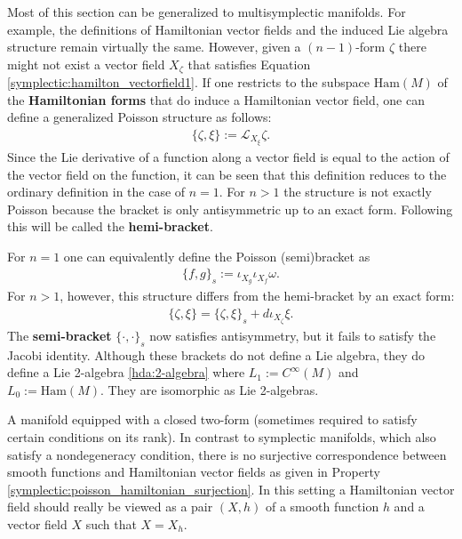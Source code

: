     \begin{remark}\label{symplectic:hamiltonian_forms}
        Most of this section can be generalized to multisymplectic manifolds. For example, the definitions of Hamiltonian vector fields and the induced Lie algebra structure remain virtually the same. However, given a $(n-1)$-form $\zeta$ there might not exist a vector field $X_\zeta$ that satisfies Equation \eqref{symplectic:hamilton_vectorfield1}. If one restricts to the subspace $\mathrm{Ham}(M)$ of the \textbf{Hamiltonian forms} that do induce a Hamiltonian vector field, one can define a generalized Poisson structure as follows:
        \begin{gather}
            \{\zeta,\xi\} := \mathcal{L}_{X_\xi}\zeta.
        \end{gather}
        Since the Lie derivative of a function along a vector field is equal to the action of the vector field on the function, it can be seen that this definition reduces to the ordinary definition in the case of $n=1$. For $n>1$ the structure is not exactly Poisson because the bracket is only antisymmetric up to an exact form. Following \cite{category_symplectic} this will be called the \textbf{hemi-bracket}.

        For $n=1$ one can equivalently define the Poisson (semi)bracket as
        \begin{gather}
            \{f,g\}_s := \iota_{X_g}\iota_{X_f}\omega.
        \end{gather}
        For $n>1$, however, this structure differs from the hemi-bracket by an exact form:
        \begin{gather}
            \{\zeta,\xi\} = \{\zeta,\xi\}_s + d\iota_{X_\zeta}\xi.
        \end{gather}
        The \textbf{semi-bracket} $\{\cdot,\cdot\}_s$ now satisfies antisymmetry, but it fails to satisfy the Jacobi identity. Although these brackets do not define a Lie algebra, they do define a Lie 2-algebra \ref{hda:2-algebra} where $L_1:=C^\infty(M)$ and $L_0:=\mathrm{Ham}(M)$. They are isomorphic as Lie 2-algebras.
    \end{remark}

    \begin{remark}
        A manifold equipped with a closed two-form (sometimes required to satisfy certain conditions on its rank). In contrast to symplectic manifolds, which also satisfy a nondegeneracy condition, there is no surjective correspondence between smooth functions and Hamiltonian vector fields as given in Property \ref{symplectic:poisson_hamiltonian_surjection}. In this setting a Hamiltonian vector field should really be viewed as a pair $(X,h)$ of a smooth function $h$ and a vector field $X$ such that $X=X_h$.
    \end{remark}

